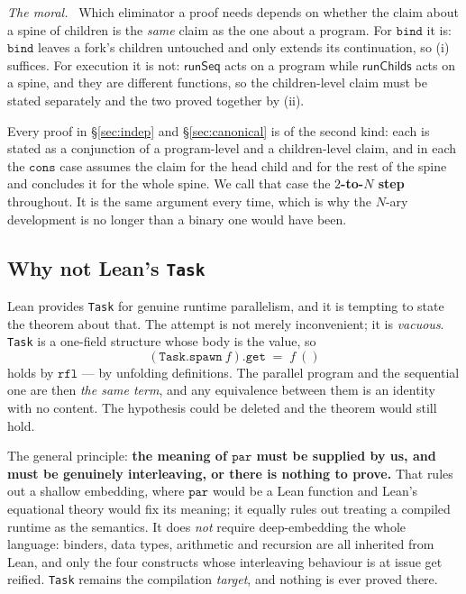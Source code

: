 \documentclass[11pt,a4paper]{article}
\theoremstyle{definition}
\theoremstyle{plain}
\theoremstyle{remark}
\newenvironment{moral}{\par\medskip\noindent\textit{The moral.}\ \ignorespaces}{\par\medskip}
\newcommand{\runSeq}{\mathsf{runSeq}}
\begin{document}
\begin{moral}
Which eliminator a proof needs depends on whether the claim about a spine of children is the
\emph{same} claim as the one about a program. For $\texttt{bind}$ it is: $\texttt{bind}$
leaves a fork's children untouched and only extends its continuation, so (i) suffices. For
execution it is not: $\runSeq$ acts on a program while $\mathsf{runChilds}$ acts on a spine,
and they are different functions, so the children-level claim must be stated separately and
the two proved together by (ii).

Every proof in \S\ref{sec:indep} and \S\ref{sec:canonical} is of the second kind: each is
stated as a conjunction of a program-level and a children-level claim, and in each the
$\texttt{cons}$ case assumes the claim for the head child and for the rest of the spine and
concludes it for the whole spine. We call that case the \textbf{$2$-to-$N$ step} throughout.
It is the same argument every time, which is why the $N$-ary development is no longer than a
binary one would have been.
\end{moral}

\subsection{Why not Lean's \texttt{Task}}\label{sec:model:task}

Lean provides \texttt{Task} for genuine runtime parallelism, and it is tempting to state the
theorem about that. The attempt is not merely inconvenient; it is \emph{vacuous}.
\texttt{Task} is a one-field structure whose body is the value, so
\[
  (\texttt{Task.spawn}\ f).\texttt{get} \;=\; f\ ()
\]
holds by $\texttt{rfl}$ --- by unfolding definitions. The parallel program and the
sequential one are then \emph{the same term}, and any equivalence between them is an
identity with no content. The hypothesis could be deleted and the theorem would still hold.

The general principle: \textbf{the meaning of $\texttt{par}$ must be supplied by us, and must
be genuinely interleaving, or there is nothing to prove.} That rules out a shallow
embedding, where $\texttt{par}$ would be a Lean function and Lean's equational theory would
fix its meaning; it equally rules out treating a compiled runtime as the semantics. It does
\emph{not} require deep-embedding the whole language: binders, data types, arithmetic and
recursion are all inherited from Lean, and only the four constructs whose interleaving
behaviour is at issue get reified. \texttt{Task} remains the compilation \emph{target}, and
nothing is ever proved there.
\end{document}
